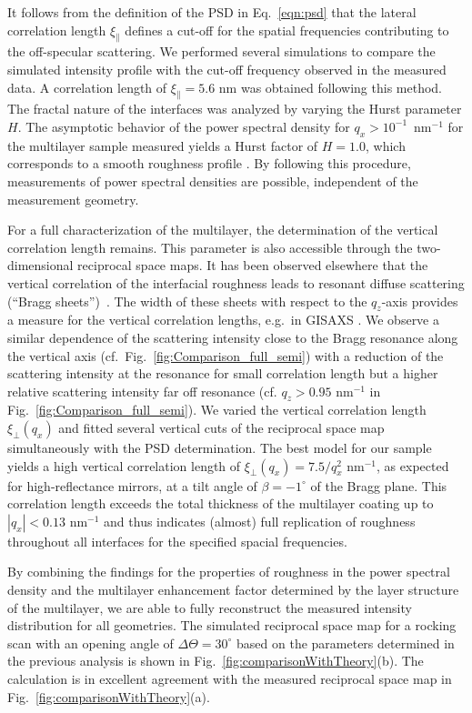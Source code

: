 It follows from the definition of the PSD in Eq.~\eqref{eqn:psd} that the lateral correlation length $\xi_\parallel$ defines a cut-off for the spatial frequencies contributing to the off-specular scattering. We performed several simulations to compare the simulated intensity profile with the cut-off frequency observed in the measured data. A correlation length of $\xi_\parallel=5.6$ nm was obtained following this method. The fractal nature of the interfaces was analyzed by varying the Hurst parameter $H$. The asymptotic behavior of the power spectral density for $q_x>10^{-1}$~nm$^{-1}$ for the multilayer sample measured yields a Hurst factor of $H=1.0$, which corresponds to a smooth roughness profile \cite{sinha_x-ray_1988}. By following this procedure, measurements of power spectral densities are possible, independent of the measurement geometry.

For a full characterization of the multilayer, the determination of the vertical correlation length remains. This parameter is also accessible through the two-dimensional reciprocal space maps. It has been observed elsewhere that the vertical correlation of the interfacial roughness leads to resonant diffuse scattering (``Bragg sheets'')~\cite{holy_nonspecular_1994}. The width of these sheets with respect to the $q_z$-axis provides a measure for the vertical correlation lengths, e.g.~in GISAXS \cite{siffalovic_characterization_2009}. We observe a similar dependence of the scattering intensity close to the Bragg resonance along the vertical axis (cf.~Fig.~\ref{fig:Comparison_full_semi}) with a reduction of the scattering intensity at the resonance for small correlation length but a higher relative scattering intensity far off resonance (cf. $q_z>0.95$ nm$^{-1}$ in Fig.~\ref{fig:Comparison_full_semi}). We varied the vertical correlation length $\xi_\perp(q_x)$ and fitted several vertical cuts of the reciprocal space map simultaneously with the PSD determination. The best model for our sample yields a high vertical correlation length of $\xi_\perp(q_x)=7.5/q_x^2$ nm$^{-1}$, as expected for high-reflectance mirrors, at a tilt angle of $\beta=-1^\circ$ of the Bragg plane. 
This correlation length exceeds the total thickness of the multilayer coating up to $|q_x|<0.13$ nm$^{-1}$ and thus indicates (almost) full replication of roughness throughout all interfaces for the specified spacial frequencies.

By combining the findings for the properties of roughness in the power spectral density and the multilayer enhancement factor determined by the layer structure of the multilayer, we are able to fully reconstruct the measured intensity distribution for all geometries. The simulated reciprocal space map for a rocking scan with an opening angle of $\Delta\Theta = 30^\circ$ based on the parameters determined in the previous analysis is shown in Fig.~\ref{fig:comparisonWithTheory}(b). The calculation is in excellent agreement with the measured reciprocal space map in Fig.~\ref{fig:comparisonWithTheory}(a). 


